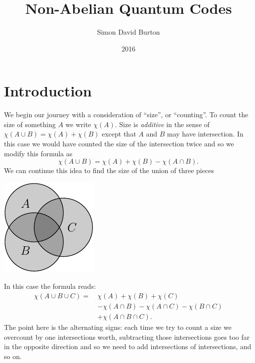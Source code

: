 \documentclass[11pt,twoside,openright]{report}
\title{Non-Abelian Quantum Codes}
\author{Simon David Burton}
\date{2016}
\def\euler{\chi}
\begin{document}
\maketitle


\declaration


\tableofcontents

\chapter{Introduction}


We begin our journey with a consideration of ``size'', or ``counting''.
To count the size of something $A$ we write $\euler(A).$
Size is \emph{additive} in the sense of 
$\euler(A\cup B) = \euler(A) + \euler(B)$ except that
$A$ and $B$ may have intersection.
In this case we would have counted the 
size of the intersection twice and so we modify this formula as
$$
    \euler(A\cup B) = \euler(A) + \euler(B) - \euler(A\cap B).
$$
We can continue this idea to find the
size of the union of three pieces
\begin{center}
\includegraphics{pic-ABC.pdf}
\end{center}
In this case the formula reads:
\begin{align}\label{EulerAddSub}
\euler(A\cup B\cup C) = \ &\euler(A) + \euler(B) + \euler(C)  \nonumber \\
                     &- \euler(A\cap B) - \euler(A\cap C) - \euler(B\cap C) \nonumber \\
                     &+ \euler(A\cap B \cap C).
\end{align}
The point here is the alternating signs:
each time we try to count a size we overcount by
one intersections worth, subtracting those intersections
goes too far in the opposite direction and so we need
to add intersections of intersections, and so on.
\end{document}
